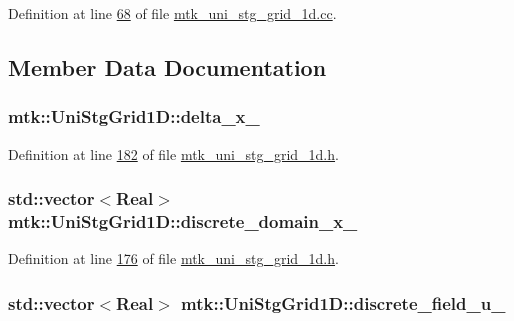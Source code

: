 Definition at line \hyperlink{mtk__uni__stg__grid__1d_8cc_source_l00068}{68} of file \hyperlink{mtk__uni__stg__grid__1d_8cc_source}{mtk\-\_\-uni\-\_\-stg\-\_\-grid\-\_\-1d.\-cc}.



\subsection{Member Data Documentation}
\hypertarget{classmtk_1_1UniStgGrid1D_a12577bbe0b88e9a0ac9b2267f2fcc48c}{
\subsubsection[{delta\-\_\-x\-\_\-}]{ mtk\-::\-Uni\-Stg\-Grid1\-D\-::delta\-\_\-x\-\_\-\hspace{0.3cm}{\ttfamily [private]}}}\label{classmtk_1_1UniStgGrid1D_a12577bbe0b88e9a0ac9b2267f2fcc48c}


Definition at line \hyperlink{mtk__uni__stg__grid__1d_8h_source_l00182}{182} of file \hyperlink{mtk__uni__stg__grid__1d_8h_source}{mtk\-\_\-uni\-\_\-stg\-\_\-grid\-\_\-1d.\-h}.

\hypertarget{classmtk_1_1UniStgGrid1D_a0a1f9c00e21659e05f414dd97e2a52e3}{
\subsubsection[{discrete\-\_\-domain\-\_\-x\-\_\-}]{\setlength{\rightskip}{0pt plus 5cm}std\-::vector$<${\bf Real}$>$ mtk\-::\-Uni\-Stg\-Grid1\-D\-::discrete\-\_\-domain\-\_\-x\-\_\-\hspace{0.3cm}{\ttfamily [private]}}}\label{classmtk_1_1UniStgGrid1D_a0a1f9c00e21659e05f414dd97e2a52e3}


Definition at line \hyperlink{mtk__uni__stg__grid__1d_8h_source_l00176}{176} of file \hyperlink{mtk__uni__stg__grid__1d_8h_source}{mtk\-\_\-uni\-\_\-stg\-\_\-grid\-\_\-1d.\-h}.

\hypertarget{classmtk_1_1UniStgGrid1D_a9a1e7c4ff7f83787a1844d8b24af8045}{
\subsubsection[{discrete\-\_\-field\-\_\-u\-\_\-}]{\setlength{\rightskip}{0pt plus 5cm}std\-::vector$<${\bf Real}$>$ mtk\-::\-Uni\-Stg\-Grid1\-D\-::discrete\-\_\-field\-\_\-u\-\_\-\hspace{0.3cm}{\ttfamily [private]}}}\label{classmtk_1_1UniStgGrid1D_a9a1e7c4ff7f83787a1844d8b24af8045}



